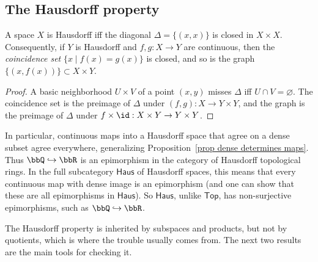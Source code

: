 \subsection{The Hausdorff property}

\begin{prop}\label{prop Hausdorff diagonal}
    A space $X$ is Hausdorff iff the diagonal $\Delta=\{(x,x)\}$ is closed in $X\times X$. Consequently, if $Y$ is Hausdorff and $f,g:X\to Y$ are continuous, then the \emph{coincidence set} $\{x\mid f(x)=g(x)\}$ is closed, and so is the graph $\{(x,f(x))\}\subset X\times Y$.
\end{prop}
\begin{proof}
    A basic neighborhood $U\times V$ of a point $(x,y)$ misses $\Delta$ iff $U\cap V=\varnothing$. The coincidence set is the preimage of $\Delta$ under $(f,g):X\to Y\times Y$, and the graph is the preimage of $\Delta$ under $f\times\id:X\times Y\to Y\times Y$.
\end{proof}

In particular, continuous maps into a Hausdorff space that agree on a dense subset agree everywhere, generalizing Proposition~\ref{prop dense determines maps}. Thus $\bbQ\hookrightarrow\bbR$ is an epimorphism in the category of Hausdorff topological rings. In the full subcategory $\mathsf{Haus}$ of Hausdorff spaces, this means that every continuous map with dense image is an epimorphism (and one can show that these are all epimorphisms in $\mathsf{Haus}$). So $\mathsf{Haus}$, unlike $\mathsf{Top}$, has non-surjective epimorphisms, such as $\bbQ\hookrightarrow\bbR$.

The Hausdorff property is inherited by subspaces and products, but not by quotients, which is where the trouble usually comes from. The next two results are the main tools for checking it.


